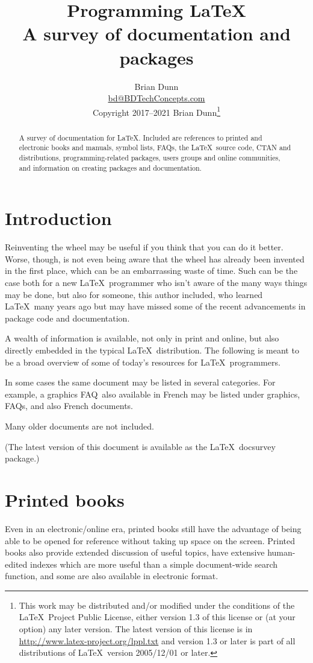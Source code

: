 \documentclass{article}
\title{Programming \LaTeX\Dash \\ A survey of documentation and packages}
\author{Brian Dunn \\
	\small \href{mailto:bd@BDTechConcepts.com}{bd@BDTechConcepts.com} \\
	\small Copyright 2017--2021 Brian Dunn\thanks{
		This work may be distributed and/or modified under the
		conditions of the \LaTeX\ Project Public License, either version 1.3
		of this license or (at your option) any later version.
		The latest version of this license is in
		\url{http://www.latex-project.org/lppl.txt}
		and version 1.3 or later is part of all distributions of \LaTeX\
		version 2005/12/01 or later.
	}
}
\def\FAQ{\acro{FAQ}}
\newcommand{\acro}[1]{\textsc{\MakeLowercase{#1}}}
\def\pkg#1{#1}%
\def\LaTeX{LaTeX}%
\def\acro#1{#1}%
\renewcommand*{\pkg}[1]{#1}
\renewcommand*{\LaTeX}{LaTeX}
\begin{document}
\maketitle


\thispagestyle{empty}

\begin{abstract}
\noindent
A survey of documentation for \LaTeX.
Included are references to printed and electronic books and manuals,
symbol lists, \FAQ{}s, the \LaTeX\ source code, CTAN and distributions,
programming-related packages, users groups and online communities,
and information on creating packages and documentation.
\end{abstract}


\tableofcontents


\section{Introduction}

Reinventing the wheel may be useful if you think that you can do it better.
Worse, though, is not even being aware that the wheel has already been
invented in the first place, which can be an embarrassing waste of time.
Such can be the case both for a new \LaTeX\ programmer who isn't aware of
the many ways things may be done, but also for someone, this author included,
who learned \LaTeX\ many years ago but may have missed some of the recent
advancements in package code and documentation.

A wealth of information is available, not only in print and online,
but also directly embedded in the typical \LaTeX\ distribution.
The following is meant to be a broad overview of some of today's resources
for \LaTeX\ programmers.

In some cases the same document may be listed in several categories.
For example, a graphics \FAQ\ also available in French may be listed under
graphics, \FAQ{}s, and also French documents.

Many older documents are not included.

(The latest version of this document is available as the \LaTeX\ \pkg{docsurvey} package.)


\section{Printed books}

Even in an electronic/online era, printed books still have the advantage
of being able to be opened for reference without taking up space
on the screen.  Printed books also provide extended discussion of
useful topics, have extensive human-edited indexes which are more useful
than a simple document-wide search function, and some are also available in
electronic format.
\end{document}
